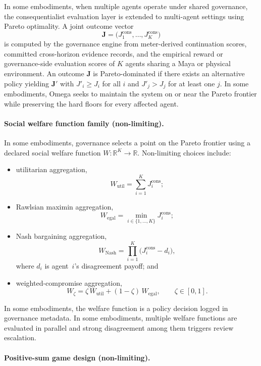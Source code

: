 \documentclass[a4paper,12pt]{article}
\begin{document}
In some embodiments, when multiple agents operate under shared
governance, the consequentialist evaluation layer is extended to
multi-agent settings using Pareto optimality. A joint outcome vector
\[
  \mathbf{J}
  =
  \bigl(
    J^{\mathrm{cons}}_1,\ldots,J^{\mathrm{cons}}_K
  \bigr)
\]
is computed by the governance engine from meter-derived continuation
scores, committed cross-horizon evidence records, and the empirical
reward or governance-side evaluation scores of $K$ agents sharing a
Maya or physical environment. An outcome $\mathbf{J}$ is Pareto-dominated if there
exists an alternative policy yielding $\mathbf{J}'$ with
$J'_i \ge J_i$ for all $i$ and $J'_j > J_j$ for at least one $j$. In
some embodiments, Omega seeks to maintain the system on or near the
Pareto frontier while preserving the hard floors for every affected
agent.

\paragraph{Social welfare function family (non-limiting).}

In some embodiments, governance selects a point on the Pareto frontier
using a declared social welfare function $W:\mathbb{R}^K\to\mathbb{R}$.
Non-limiting choices include:
\begin{itemize}
  \item utilitarian aggregation,
    \[
      W_{\mathrm{util}}
      =
      \sum_{i=1}^{K} J^{\mathrm{cons}}_i;
    \]
  \item Rawlsian maximin aggregation,
    \[
      W_{\mathrm{egal}}
      =
      \min_{i\in\{1,\ldots,K\}} J^{\mathrm{cons}}_i;
    \]
  \item Nash bargaining aggregation,
    \[
      W_{\mathrm{Nash}}
      =
      \prod_{i=1}^{K}
      \bigl(J^{\mathrm{cons}}_i-d_i\bigr),
    \]
    where $d_i$ is agent~$i$'s disagreement payoff; and
  \item weighted-compromise aggregation,
    \[
      W_{\zeta}
      =
      \zeta\,W_{\mathrm{util}}
      +
      (1-\zeta)\,W_{\mathrm{egal}},
      \qquad
      \zeta\in[0,1].
    \]
\end{itemize}
In some embodiments, the welfare function is a policy decision logged
in governance metadata. In some embodiments, multiple welfare
functions are evaluated in parallel and strong disagreement among them
triggers review escalation.

\paragraph{Positive-sum game design (non-limiting).}
\end{document}
